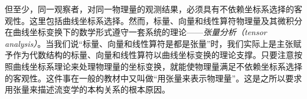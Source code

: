 \documentclass[main.tex]{subfiles}
\begin{document}
但至少，同一观察者，对同一物理量的观测结果，必须具有不依赖坐标系选择的客观性。这里包括曲线坐标系选择。然而，标量、向量和线性算符物理量及其微积分在曲线坐标变换下的数学形式遵守一套系统的理论——\emph{张量分析（tensor analysis）}。当我们说“标量、向量和线性算符是都是张量”时，我们实际上是主张赋予作为代数结构的标量、向量和线性算符以曲线坐标变换的理论支撑。只要注意按照曲线坐标系理论来处理物理量的坐标变换，就能使物理量满足不依赖坐标系选择的客观性。这件事在一般的教材中又叫做“用张量来表示物理量”。这是之所以要求用张量来描述流变学的本构关系的根本原因。
\end{document}
